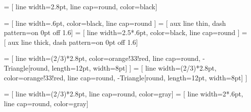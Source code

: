 \def\beamlinewidth{2.8pt}
\def\beamcolor{black}
 = [ line width=\beamlinewidth, line cap=round, color=\beamcolor ]

\def\auxlinewidth{.6pt}
 = [ line width=\auxlinewidth, color=black, line cap=round ]
 = [ aux line thin, dash pattern=on 0pt off 1.6\pgflinewidth ]
 = [ line width=2.5*\auxlinewidth, color=black, line cap=round ]
 = [ aux line thick, dash pattern=on 0pt off 1.6\pgflinewidth ]

\def\colorforforces{orange!33!red}
\def\externalforcecolor{\colorforforces}
 =
	[ line width=(2/3)*\beamlinewidth, color=\externalforcecolor, line cap=round, -{Triangle[round, length=12pt, width=8pt]} ]
\def\internalforcecolor{\colorforforces}
 =
	[ line width=(2/3)*\beamlinewidth, color=\internalforcecolor, line cap=round, -{Triangle[round, length=12pt, width=8pt]} ]

\def\textscale{1.2}

\def\reflength{5} %

\pgfmathsetmacro\cornerlength{\reflength / 20}

\pgfmathsetmacro\onePl{\reflength / 3}
\pgfmathsetmacro\justP{\onePl / \reflength}

\def\epurehatchsteps{12} %
\pgfmathsetmacro\hatchstep{\reflength / (\epurehatchsteps - 1)}

\tikzset{
	hatch distance/.store in=\hatchdistance,
	hatch distance=15pt,
	hatch thickness/.store in=\hatchthickness,
	hatch thickness=.6pt %
}

\makeatletter
{}
	{\pgfqpoint{0pt}{0pt}}
	{\pgfqpoint{\hatchdistance}{\hatchdistance}}
	{\pgfpoint{\hatchdistance-1pt}{\hatchdistance-1pt}}%
	{
		\pgfsetcolor{\tikz@pattern@color}
		\pgfsetlinewidth{\hatchthickness}
		\pgfpathmoveto{\pgfqpoint{0pt}{0pt}}
		\pgfpathlineto{\pgfqpoint{\hatchdistance}{\hatchdistance}}
	}
\makeatother

\def\clampsize{.8}
\def\clampcolor{gray}

 = [ line width=(2/3)*\beamlinewidth, line cap=round, color=\clampcolor ]
 = [ line width=2*\auxlinewidth, line cap=round, color=\clampcolor ]

